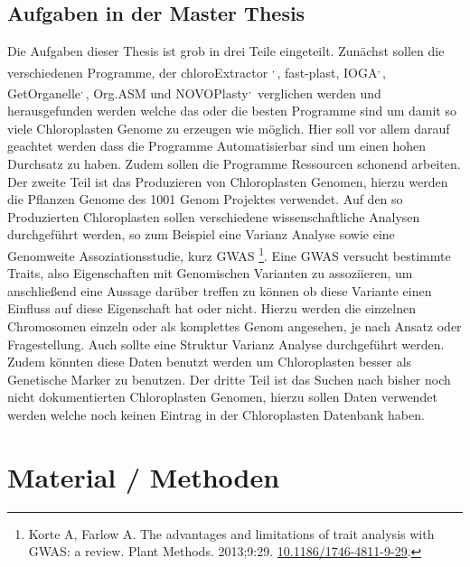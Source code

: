 \documentclass{scrartcl}
\begin{document}
\subsection{Aufgaben in der Master Thesis}
\label{sec-2-7}
Die Aufgaben dieser Thesis ist grob in drei Teile eingeteilt. Zunächst sollen die verschiedenen Programme, der chloroExtractor \footnotemark[15]{}\textsuperscript{,}\,\footnotemark[16]{}, fast-plast\footnotemark[21]{}, IOGA\footnotemark[29]{}\textsuperscript{,}\,\footnotemark[30]{}, GetOrganelle\footnotemark[27]{}\textsuperscript{,}\,\footnotemark[28]{},
Org.ASM \footnotemark[24]{}und NOVOPlasty\footnotemark[22]{}\textsuperscript{,}\,\footnotemark[23]{} verglichen werden und herausgefunden werden welche das oder die besten Programme sind um damit so viele Chloroplasten Genome zu erzeugen wie 
möglich. Hier soll vor allem darauf geachtet werden dass die Programme Automatisierbar sind um einen hohen Durchsatz zu haben. Zudem sollen die Programme Ressourcen schonend arbeiten. 
Der zweite Teil ist das Produzieren von Chloroplasten Genomen, hierzu werden die Pflanzen Genome des 1001 Genom Projektes verwendet. Auf den so
Produzierten Chloroplasten sollen verschiedene wissenschaftliche Analysen durchgeführt werden, so zum Beispiel eine Varianz Analyse sowie eine Genomweite Assoziationsstudie, kurz GWAS \footnote{Korte A, Farlow A. The advantages and limitations of trait analysis with GWAS: a review. Plant Methods. 2013;9:29. \url{10.1186/1746-4811-9-29}.}.
Eine GWAS versucht bestimmte Traits, also Eigenschaften mit Genomischen Varianten zu assoziieren, um anschließend eine Aussage darüber treffen zu können ob diese Variante einen Einfluss auf diese 
Eigenschaft hat oder nicht. Hierzu werden die einzelnen Chromosomen einzeln oder als komplettes Genom angesehen, je nach Ansatz oder Fragestellung.
Auch sollte eine Struktur Varianz Analyse durchgeführt werden. Zudem könnten diese Daten benutzt werden um Chloroplasten besser als Genetische Marker zu benutzen. 
Der dritte Teil ist das Suchen nach bisher noch nicht dokumentierten Chloroplasten Genomen, hierzu sollen Daten verwendet werden welche noch keinen Eintrag in der Chloroplasten Datenbank haben.



\section{Material / Methoden}
\label{sec-3}
\end{document}
